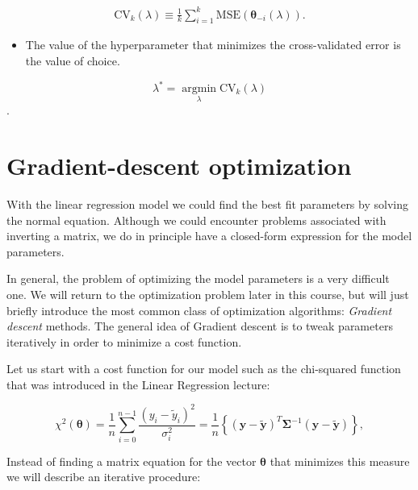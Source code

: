 \documentclass[%
oneside,                 %
final,                   %
10pt]{article}
\begin{document}
\noindent
\begin{align*}
\mathrm{CV}_k(\lambda) \equiv
\frac{1}{k} \sum_{i = 1}^k \mathrm{MSE} \left( \bm{\theta}_{-i}(\lambda) \right).
\end{align*}

\begin{itemize}
\item The value of the hyperparameter that minimizes the cross-validated error is the value of choice. 
\end{itemize}

\noindent
\[
\lambda^* = \underset{\lambda}{\operatorname{argmin}}
\mathrm{CV}_k(\lambda)
\].



\section{Gradient-descent optimization}

With the linear regression model we could find the best fit parameters by solving the normal equation. Although we could encounter problems associated with inverting a matrix, we do in principle have a closed-form expression for the model parameters.

In general, the problem of optimizing the model parameters is a very difficult one. We will return to the optimization problem later in this course, but will just briefly introduce the most common class of optimization algorithms: \emph{Gradient descent} methods. The general idea of Gradient descent is to tweak parameters iteratively in order to minimize a cost function.

Let us start with a cost function for our model such as the chi-squared function that was introduced in the Linear Regression lecture:

\[
\chi^2(\bm{\theta})=\frac{1}{n}\sum_{i=0}^{n-1}\frac{\left(y_i-\tilde{y}_i\right)^2}{\sigma_i^2}=\frac{1}{n}\left\{\left(\bm{y}-\bm{\tilde{y}}\right)^T \bm{\Sigma}^{-1}\left(\bm{y}-\bm{\tilde{y}}\right)\right\},
\]

Instead of finding a matrix equation for the vector $\bm{\theta}$ that minimizes this measure we will describe an iterative procedure:
\end{document}
